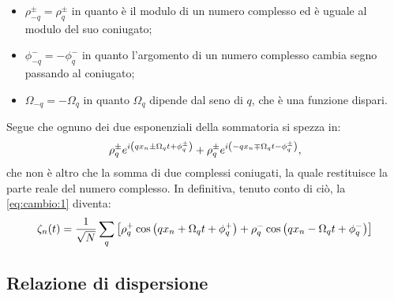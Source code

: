     \begin{itemize}
        \item $\rho_{-q}^\pm=\rho_{q}^\pm$ in quanto \`e il modulo di un numero complesso ed \`e uguale al modulo del suo coniugato;
        \item $\phi_{-q}^-=-\phi_q^-$ in quanto l'argomento di un numero complesso cambia segno passando al coniugato;
        \item $\Omega_{-q}=-\Omega_q$ in quanto $\Omega_q$ dipende dal seno di $q$, che \`e una funzione dispari.
    \end{itemize}
    Segue che ognuno dei due esponenziali della sommatoria si spezza in: $$\rho_q^\pm e^{i\qty(qx_n\pm\Omega_qt+\phi_q^\pm)}+\rho_{q}^\pm e^{i\qty(-qx_n\mp\Omega_qt-\phi_{q}^\pm)},$$ che non \`e altro che la somma di due complessi coniugati, la quale restituisce la parte reale del numero complesso. In definitiva, tenuto conto di ci\`o, la \eqref{eq:cambio:1} diventa:
    \begin{equation}
        \zeta_n\qty(t)=\frac{1}{\sqrt{N}}\sum_q\qty[\rho_q^+\cos\qty(qx_n+\Omega_qt+\phi_q^+)+\rho_q^-\cos\qty(qx_n-\Omega_qt+\phi_q^-)]
    \end{equation}
    
    \subsection{Relazione di dispersione}
